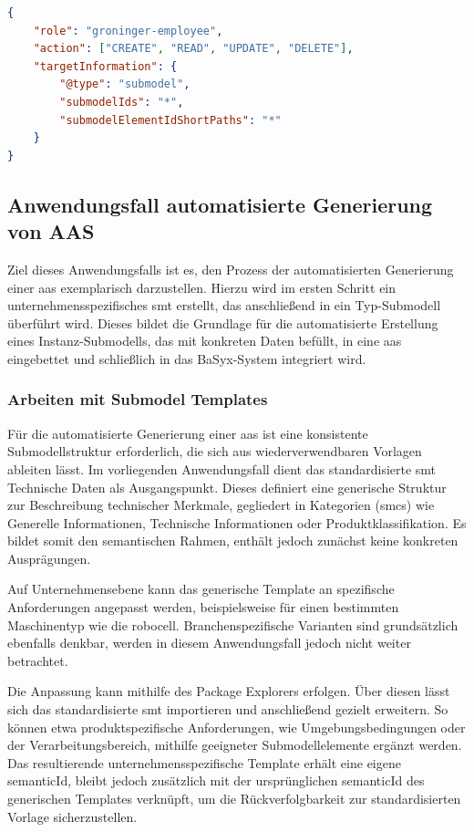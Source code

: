 \begin{lstlisting}[language=json, caption={RBAC-Konfiguration für die Rolle Groninger-Mitarbeiter}, label={lst:groningerMitarbeiterRBAC}]
{
    "role": "groninger-employee",
    "action": ["CREATE", "READ", "UPDATE", "DELETE"],
    "targetInformation": {
        "@type": "submodel",
        "submodelIds": "*",
        "submodelElementIdShortPaths": "*"
    }
}
\end{lstlisting}

\subsection{Anwendungsfall automatisierte Generierung von AAS}
Ziel dieses Anwendungsfalls ist es, den Prozess der automatisierten Generierung einer \acs{aas} exemplarisch darzustellen. 
Hierzu wird im ersten Schritt ein unternehmensspezifisches \acs{smt} erstellt, das anschließend in ein Typ-Submodell überführt wird.
Dieses bildet die Grundlage für die automatisierte Erstellung eines Instanz-Submodells, das mit konkreten Daten befüllt, in eine \acs{aas} eingebettet und schließlich in das BaSyx-System integriert wird.

\subsubsection{Arbeiten mit Submodel Templates}
\label{chap:ErstellenvonSubmodelTemplates}
Für die automatisierte Generierung einer \acs{aas} ist eine konsistente Submodellstruktur erforderlich, die sich aus wiederverwendbaren Vorlagen ableiten lässt.
Im vorliegenden Anwendungsfall dient das standardisierte \acs{smt} Technische Daten \cite{SpezifikaitonTechnischeDaten} als Ausgangspunkt. 
Dieses definiert eine generische Struktur zur Beschreibung technischer Merkmale, gegliedert in Kategorien (\acsp{smc}) wie Generelle Informationen, Technische Informationen oder Produktklassifikation. 
Es bildet somit den semantischen Rahmen, enthält jedoch zunächst keine konkreten Ausprägungen.

Auf Unternehmensebene kann das generische Template an spezifische Anforderungen angepasst werden, beispielsweise für einen bestimmten Maschinentyp wie die robocell.
Branchenspezifische Varianten sind grundsätzlich ebenfalls denkbar, werden in diesem Anwendungsfall jedoch nicht weiter betrachtet.

Die Anpassung kann mithilfe des Package Explorers erfolgen.
Über diesen lässt sich das standardisierte \acs{smt} importieren und anschließend gezielt erweitern.
So können etwa produktspezifische Anforderungen, wie Umgebungsbedingungen oder der Verarbeitungsbereich, mithilfe geeigneter Submodellelemente ergänzt werden.
Das resultierende unternehmensspezifische Template erhält eine eigene semanticId, bleibt jedoch zusätzlich mit der ursprünglichen semanticId des generischen Templates verknüpft, um die Rückverfolgbarkeit zur standardisierten Vorlage sicherzustellen.

